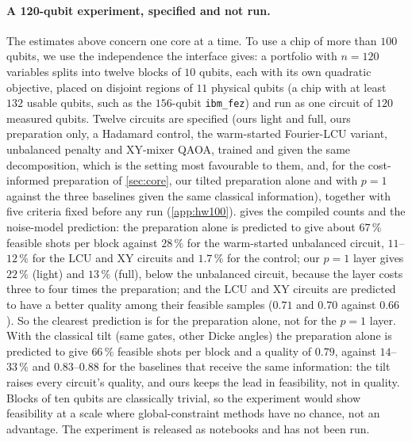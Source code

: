 \paragraph{A 120-qubit experiment, specified and not run.} The estimates above concern one core at a time. To use a chip of more than $100$ qubits, we use the independence the interface gives: a portfolio with $n=120$ variables splits into twelve blocks of $10$ qubits, each with its own quadratic objective, placed on disjoint regions of $11$ physical qubits (a chip with at least $132$ usable qubits, such as the $156$-qubit \texttt{ibm\_fez}) and run as one circuit of $120$ measured qubits. Twelve circuits are specified (ours light and full, ours preparation only, a Hadamard control, the warm-started Fourier-LCU variant, unbalanced penalty and XY-mixer QAOA, trained and given the same decomposition, which is the setting most favourable to them, and, for the cost-informed preparation of \cref{sec:core}, our tilted preparation alone and with $p=1$ against the three baselines given the same classical information), together with five criteria fixed before any run (\cref{app:hw100}).  gives the compiled counts and the noise-model prediction: the preparation alone is predicted to give about $67\,\%$ feasible shots per block against $28\,\%$ for the warm-started unbalanced circuit, $11$--$12\,\%$ for the LCU and XY circuits and $1.7\,\%$ for the control; our $p=1$ layer gives $22\,\%$ (light) and $13\,\%$ (full), below the unbalanced circuit, because the layer costs three to four times the preparation; and the LCU and XY circuits are predicted to have a better quality among their feasible samples ($0.71$ and $0.70$ against $0.66$). So the clearest prediction is for the preparation alone, not for the $p=1$ layer. With the classical tilt (same gates, other Dicke angles) the preparation alone is predicted to give $66\,\%$ feasible shots per block and a quality of $0.79$, against $14$--$33\,\%$ and $0.83$--$0.88$ for the baselines that receive the same information: the tilt raises every circuit's quality, and ours keeps the lead in feasibility, not in quality. Blocks of ten qubits are classically trivial, so the experiment would show feasibility at a scale where global-constraint methods have no chance, not an advantage. The experiment is released as notebooks and has not been run.



